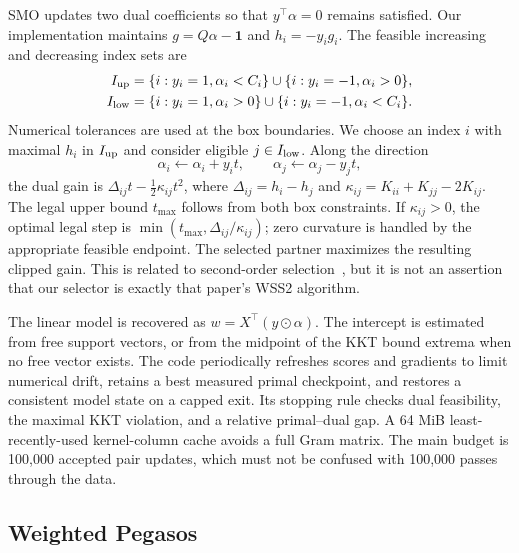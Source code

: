 \documentclass{article}
\begin{document}
SMO updates two dual coefficients so that $y^\top\alpha=0$ remains satisfied. Our implementation maintains $g=Q\alpha-\mathbf1$ and $h_i=-y_i g_i$. The feasible increasing and decreasing index sets are
\begin{align}
 I_{\rm up}&=\{i:y_i=1,\alpha_i<C_i\}\cup\{i:y_i=-1,\alpha_i>0\},\\
 I_{\rm low}&=\{i:y_i=1,\alpha_i>0\}\cup\{i:y_i=-1,\alpha_i<C_i\}.
\end{align}
Numerical tolerances are used at the box boundaries. We choose an index $i$ with maximal $h_i$ in $I_{\rm up}$ and consider eligible $j\in I_{\rm low}$. Along the direction
\begin{equation}
 \alpha_i\leftarrow\alpha_i+y_i t,\qquad
 \alpha_j\leftarrow\alpha_j-y_j t,
 \label{eq:pair}
\end{equation}
the dual gain is $\Delta_{ij}t-\tfrac12\kappa_{ij}t^2$, where
$\Delta_{ij}=h_i-h_j$ and $\kappa_{ij}=K_{ii}+K_{jj}-2K_{ij}$. The legal upper bound $t_{\max}$ follows from both box constraints. If $\kappa_{ij}>0$, the optimal legal step is $\min(t_{\max},\Delta_{ij}/\kappa_{ij})$; zero curvature is handled by the appropriate feasible endpoint. The selected partner maximizes the resulting clipped gain. This is related to second-order selection~\citep{fan2005}, but it is not an assertion that our selector is exactly that paper's WSS2 algorithm.

The linear model is recovered as $w=X^\top(y\odot\alpha)$. The intercept is estimated from free support vectors, or from the midpoint of the KKT bound extrema when no free vector exists. The code periodically refreshes scores and gradients to limit numerical drift, retains a best measured primal checkpoint, and restores a consistent model state on a capped exit. Its stopping rule checks dual feasibility, the maximal KKT violation, and a relative primal--dual gap. A 64 MiB least-recently-used kernel-column cache avoids a full Gram matrix. The main budget is 100,000 accepted pair updates, which must not be confused with 100,000 passes through the data.

\subsection{Weighted Pegasos}
\end{document}
